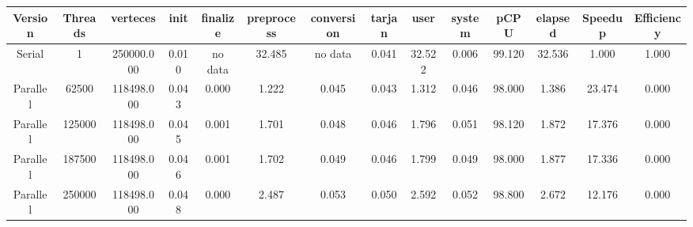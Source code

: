 \begin{tabular}{|c|c|c|c|c|c|c|c|c|c|c|c|c|c|}
\toprule
 Version &  Threads &   verteces &  init & finalize &  preprocess & conversion &  tarjan &   user &  system &   pCPU &  elapsed &  Speedup &  Efficiency \\
\midrule
  Serial &        1 & 250000.000 & 0.010 &  no data &      32.485 &    no data &   0.041 & 32.522 &   0.006 & 99.120 &   32.536 &    1.000 &       1.000 \\
Parallel &    62500 & 118498.000 & 0.043 &    0.000 &       1.222 &      0.045 &   0.043 &  1.312 &   0.046 & 98.000 &    1.386 &   23.474 &       0.000 \\
Parallel &   125000 & 118498.000 & 0.045 &    0.001 &       1.701 &      0.048 &   0.046 &  1.796 &   0.051 & 98.120 &    1.872 &   17.376 &       0.000 \\
Parallel &   187500 & 118498.000 & 0.046 &    0.001 &       1.702 &      0.049 &   0.046 &  1.799 &   0.049 & 98.000 &    1.877 &   17.336 &       0.000 \\
Parallel &   250000 & 118498.000 & 0.048 &    0.000 &       2.487 &      0.053 &   0.050 &  2.592 &   0.052 & 98.800 &    2.672 &   12.176 &       0.000 \\
\bottomrule
\end{tabular}
